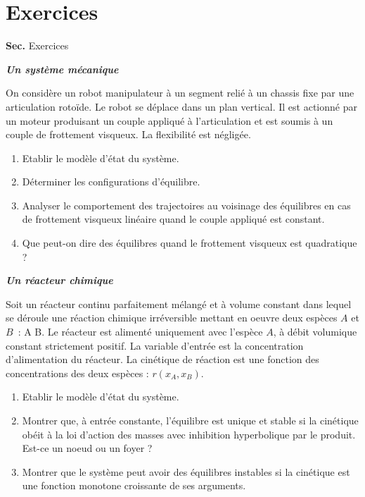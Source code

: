 {\newpage
\section{Exercices}
{{\bf Sec. \thesection}\hfill Exercices
\hspace*{5mm}}
 
\begin{exercice} {\bf \em Un système mécanique}

On considère un robot manipulateur à un segment relié à un
chassis  fixe par une articulation rotoïde. Le robot se déplace dans un
plan vertical. Il est actionné par un moteur produisant un couple
appliqué
à l'articulation et est soumis à un couple de frottement visqueux. La
flexibilité est négligée.
\begin{enumerate}
\item Etablir le modèle d'état du système.
\item Déterminer les configurations d'équilibre.
\item Analyser le comportement des trajectoires au voisinage des
équilibres en cas de frottement visqueux linéaire quand le couple
appliqué est constant.
\item Que peut-on dire des équilibres quand le frottement visqueux
est quadratique ?
\end{enumerate}
\end{exercice}
\vv

\begin{exercice}{\bf \em Un réacteur chimique}

Soit un réacteur continu parfaitement mélangé et à volume
constant dans lequel se déroule une réaction chimique 
irréversible mettant en oeuvre deux espèces $A$ et $B$~:
\eqnn
A \longrightarrow B.
\eeqnn
Le réacteur est alimenté uniquement avec l'espèce $A$, à
débit volumique constant strictement positif. La variable d'entrée est
la concentration d'alimentation du réacteur. La cinétique de réaction
est une fonction des concentrations des deux espèces : $r(x_A,x_B)$. 
\begin{enumerate}
\item Etablir le modèle d'état du système.
\item Montrer que, à entrée constante,  l'équilibre est unique et
stable si la cinétique obéit à la loi d'action des masses avec inhibition
hyperbolique par le produit.  Est-ce un noeud ou un foyer ?
\item Montrer que le système peut avoir des équilibres instables 
si la cinétique est une fonction monotone croissante de ses
arguments. 
\end{enumerate}
\end{exercice}
\vv

}
